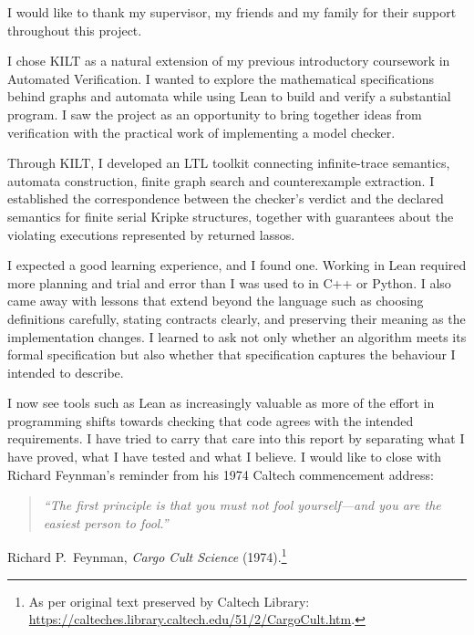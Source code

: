 \label{sec:abstract}

I would like to thank my supervisor, my friends and my family for their
support throughout this project.

I chose KILT as a natural extension of my previous introductory coursework
in Automated Verification. I wanted to explore the mathematical
specifications behind graphs and automata while using Lean to build and
verify a substantial program. I saw the project as an opportunity to bring
together ideas from verification with the practical work of implementing a
model checker.

Through KILT, I developed an LTL toolkit connecting infinite-trace semantics,
automata construction, finite graph search and counterexample extraction.
I established the correspondence between the checker's verdict and the
declared semantics for finite serial Kripke structures, together with
guarantees about the violating executions represented by returned lassos.

I expected a good learning experience, and I found one. Working in Lean
required more planning and trial and error than I was used to in C++ or
Python. I also came away with lessons that extend beyond the language such as
choosing definitions carefully, stating contracts clearly, and preserving
their meaning as the implementation changes. I learned to ask not only whether
an algorithm meets its formal specification but also whether that specification
captures the behaviour I intended to describe.

I now see tools such as Lean as increasingly valuable as more of the effort
in programming shifts towards checking that code agrees with the intended
requirements. I have tried to carry that care into this report by separating
what I have proved, what I have tested and what I believe. I would like to
close with Richard Feynman's reminder from his 1974 Caltech commencement
address:

\vspace{1.5em}

\begin{quote}
  \itshape
  ``The first principle is that you must not fool yourself---and you are the
  easiest person to fool.''
\end{quote}
\hfill Richard P.~Feynman, \emph{Cargo Cult Science} (1974).\footnote{%
  As per original text preserved by Caltech Library:
  \url{https://calteches.library.caltech.edu/51/2/CargoCult.htm}.}
